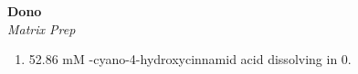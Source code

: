 \textbf{Dono} 
\\
\textit{Matrix Prep}
\begin{enumerate}
\item{52.86 mM \alpha-cyano-4-hydroxycinnamid acid dissolving in 0.}
\end{enumerate}

